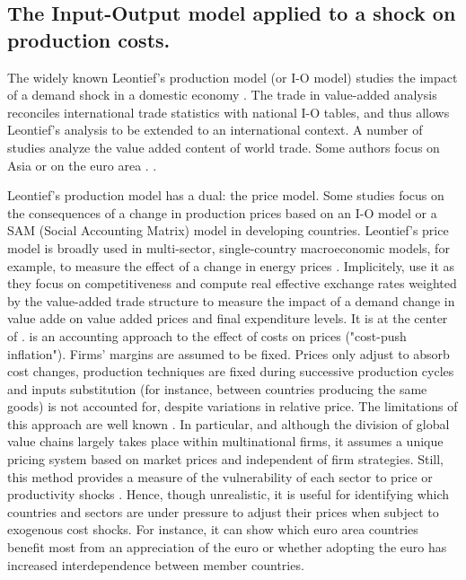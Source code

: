 \documentclass[11pt,a4paper]{article}
\begin{document}
\subsection{The Input-Output model applied to a shock on production costs.}
\label{subsec:io}
The widely known Leontief's production model (or I-O model) studies the impact of a demand shock in a domestic economy \citep{Leontief1951}. The trade in value-added analysis reconciles international trade statistics with national I-O tables, and thus allows Leontief's analysis to be extended to an international context. A number of studies \citep{Hummels2001,Daudin2006,Daudin2011, DeBacker2012,Johnson2012,Koopman2014, Amador2015,Los2016} analyze the value added content of world trade. Some authors focus on Asia \citep{Sato2014} or on the euro area \citep{Cappariello2015}. .

Leontief's production model has a dual: the price model. Some studies focus on the consequences of a change in production prices based on an I-O model or a SAM (Social Accounting Matrix) model in developing countries. Leontief's price model is broadly used in multi-sector, single-country macroeconomic models, for example, to measure the effect of a change in energy prices \citep{Bournay2015, Sharify2013}. Implicitely, \cite{Bems2015} use it as they focus on competitiveness and compute real effective exchange rates weighted by the value-added trade structure to measure the impact of a demand change in value adde on value added prices and final expenditure levels. It is at the center of  \cite{Cochard2016}. 
\cite{Cochard2016} is an accounting approach to the effect of costs on prices ("cost-push inflation"). Firms' margins are assumed to be fixed. Prices only adjust to absorb cost changes, production techniques are fixed during successive production cycles and inputs substitution (for instance, between countries producing the same goods) is not accounted for, despite variations in relative price. The limitations of this approach are well known \citep{Folloni1994}. In particular, and although the division of global value chains largely takes place within multinational firms, it assumes a unique pricing system based on market prices and independent of firm strategies. Still, this method provides a measure of the vulnerability of each sector to price or productivity shocks \citep{Acemoglu2012,Carvalho2014}. Hence, though unrealistic, it is useful for identifying which countries and sectors are under pressure to adjust their prices when subject to exogenous cost shocks. For instance, it can show which euro area countries benefit most from an appreciation of the euro or whether adopting the euro has increased interdependence between member countries.
\end{document}
